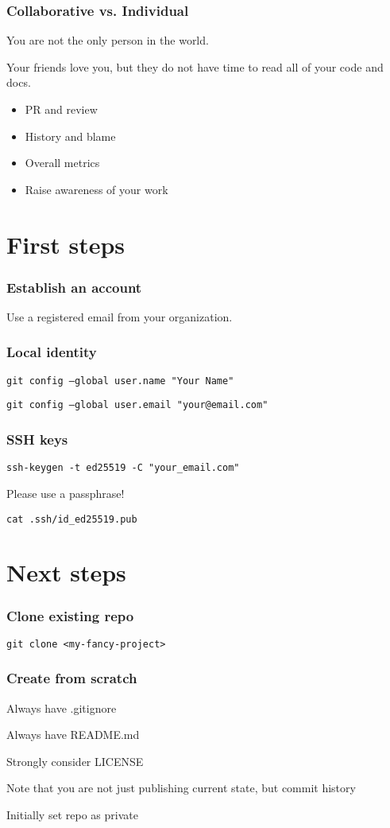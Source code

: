 \documentclass{beamer}
\begin{document}
\frame
{
   \frametitle{Collaborative vs. Individual}

    You are not the only person in the world.

    Your friends love you, but they do not have time to read all of your code and docs.

   \begin{itemize}
      \item<1-> PR and review

      \item<2-> History and blame

      \item<3-> Overall metrics

      \item<4-> Raise awareness of your work

   \end{itemize}

}

\section{First steps}

\frame
{
   \frametitle{Establish an account}

    Use a registered email from your organization.
}

\frame
{
   \frametitle{Local identity}

   \texttt{git config --global user.name "Your Name"}

   \texttt{git config --global user.email "your@email.com"}

}

\frame
{
   \frametitle{SSH keys}

   \texttt{ssh-keygen -t ed25519 -C "your\_email\@example.com"}

   Please use a passphrase!

   \texttt{cat .ssh/id\_ed25519.pub}

}

\section{Next steps}


\frame
{
   \frametitle{Clone existing repo}

   \texttt{git clone <my-fancy-project>}

}

\frame
{
   \frametitle{Create from scratch}

   Always have .gitignore

    Always have README.md

    Strongly consider LICENSE

    Note that you are not just publishing current state, but commit history

    Initially set repo as private

}
\end{document}
